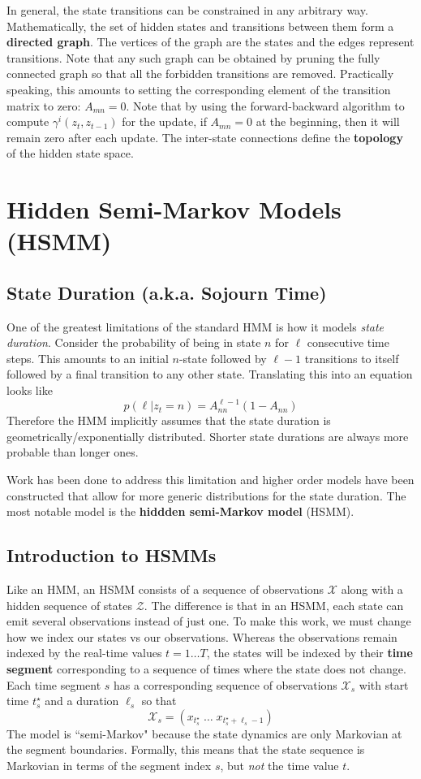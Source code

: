 \documentclass[onecolumn]{gwclass}
\begin{document}
	In general, the state transitions can be constrained in any arbitrary way. Mathematically, the set of hidden states and transitions between them form a \textbf{directed graph}. The vertices of the graph are the states and the edges represent transitions. Note that any such graph can be obtained by pruning the fully connected graph so that all the forbidden transitions are removed. Practically speaking, this amounts to setting the corresponding element of the transition matrix to zero: $A_{mn}=0$. Note that by using the forward-backward algorithm to compute $\gamma^i(z_t,z_{t-1})$ for the update, if $A_{mn}=0$ at the beginning, then it will remain zero after each update.  The inter-state connections define the \textbf{topology} of the hidden state space.
	
	
	
	\section{Hidden Semi-Markov Models (HSMM)}
	\subsection{State Duration (a.k.a. Sojourn Time)}
	One of the greatest limitations of the standard HMM is how it models \emph{state duration}. Consider the probability of being in state $n$ for $\ell$ consecutive time steps. This amounts to an initial $n$-state followed by $\ell-1$ transitions to itself followed by a final transition to any other state. Translating this into an equation looks like
	$$ p(\ell|z_t=n)= A_{nn}^{\ell-1}(1 - A_{nn}) $$
	Therefore the HMM implicitly assumes that the state duration is geometrically/exponentially distributed. Shorter state durations are always more probable than longer ones. 
	
	Work has been done to address this limitation and higher order models have been constructed that allow for more generic distributions for the state duration. The most notable model is the \textbf{hiddden semi-Markov model} (HSMM).
	
	\subsection{Introduction to HSMMs}
	Like an HMM, an HSMM consists of a sequence of observations $\mathcal{X}$ along with a hidden sequence of states $\mathcal{Z}$. The difference is that in an HSMM, each state can emit several observations instead of just one. To make this work, we must change how we index our states vs our observations. Whereas the observations remain indexed by the real-time values $t=1\dots T$, the states will be indexed by their \textbf{time segment} corresponding to a sequence of times where the state does not change. Each time segment $s$ has a corresponding sequence of observations $\mathcal{X}_s$ with start time $t_s^\star$ and a duration $\ell_s$ so that
	$$ \mathcal{X}_s = (x_{t_s^\star}\; \dots\; x_{t_s^\star+\ell_s-1} )$$
	The model is ``semi-Markov" because the state dynamics are only Markovian at the segment boundaries. Formally, this means that the state sequence is Markovian in terms of the segment index $s$, but \emph{not} the time value $t$. 
	
\end{document}
